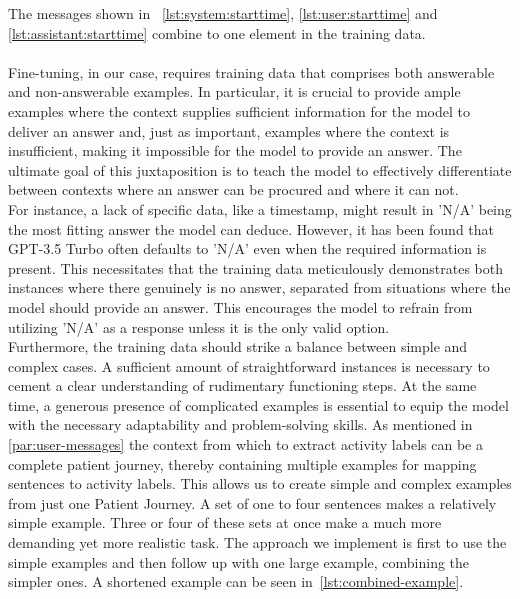 The messages shown in ~\autoref{lst:system:starttime}, \ref{lst:user:starttime} and \ref{lst:assistant:starttime} combine to one element in the training data.\\\\

Fine-tuning, in our case, requires training data that comprises both answerable and non-answerable examples. In particular, it is crucial to provide ample examples where the context supplies sufficient information for the model to deliver an answer and, just as important, examples where the context is insufficient, making it impossible for the model to provide an answer. The ultimate goal of this juxtaposition is to teach the model to effectively differentiate between contexts where an answer can be procured and where it can not.\\
For instance, a lack of specific data, like a timestamp, might result in 'N/A' being the most fitting answer the model can deduce. However, it has been found that GPT-3.5 Turbo often defaults to 'N/A' even when the required information is present. This necessitates that the training data meticulously demonstrates both instances where there genuinely is no answer, separated from situations where the model should  provide an answer. This encourages the model to refrain from utilizing 'N/A' as a response unless it is the only valid option.\\
Furthermore, the training data should strike a balance between simple and complex cases. A sufficient amount of straightforward instances is necessary to cement a clear understanding of rudimentary functioning steps. At the same time, a generous presence of complicated examples is essential to equip the model with the necessary adaptability and problem-solving skills. As mentioned in \ref{par:user-messages} the context from which to extract activity labels can be a complete patient journey, thereby containing multiple examples for mapping sentences to activity labels. This allows us to create simple and complex examples from just one Patient Journey. A set of one to four sentences makes a relatively simple example. Three or four of these sets at once make a much more demanding yet more realistic task. The approach we implement is first to use the simple examples and then follow up with one large example, combining the simpler ones. A shortened example can be seen in~\autoref{lst:combined-example}.
